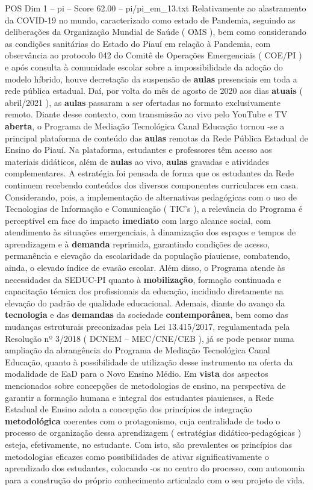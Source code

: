 \begin{textsample}{POS Dim 1 – pi – Score 62.00 – pi/pi\_em\_13.txt}
Relativamente ao alastramento da COVID-19 no mundo, caracterizado como estado de Pandemia, seguindo as deliberações da Organização Mundial de Saúde ( OMS ), bem como considerando as condições sanitárias do Estado do Piauí em relação à Pandemia, com observância ao protocolo 042 do Comitê de Operações Emergenciais ( COE/PI ) e após consulta à comunidade escolar sobre a impossibilidade da adoção do modelo híbrido, houve decretação da suspensão de \textbf{aulas} presenciais em toda a rede pública estadual.
Daí, por volta do mês de agosto de 2020 aos dias \textbf{atuais} ( abril/2021 ), as \textbf{aulas} passaram a ser ofertadas no formato exclusivamente remoto.
Diante desse contexto, com transmissão ao vivo pelo YouTube e TV \textbf{aberta}, o Programa de Mediação Tecnológica Canal Educação tornou -se a principal plataforma de conteúdo das \textbf{aulas} remotas da Rede Pública Estadual de Ensino do Piauí.
Na plataforma, estudantes e professores têm acesso aos materiais didáticos, além de \textbf{aulas} ao vivo, \textbf{aulas} gravadas e atividades complementares.
A estratégia foi pensada de forma que os estudantes da Rede continuem recebendo conteúdos dos diversos componentes curriculares em casa.
Considerando, pois, a implementação de alternativas pedagógicas com o uso de Tecnologias de Informação e Comunicação ( TIC’s ), a relevância do Programa é perceptível em face do impacto \textbf{imediato} com largo alcance social, com atendimento às situações emergenciais, à dinamização dos espaços e tempos de aprendizagem e à \textbf{demanda} reprimida, garantindo condições de acesso, permanência e elevação da escolaridade da população piauiense, combatendo, ainda, o elevado índice de evasão escolar.
Além disso, o Programa atende às necessidades da SEDUC-PI quanto à \textbf{mobilização}, formação continuada e capacitação técnica dos profissionais da educação, incidindo diretamente na elevação do padrão de qualidade educacional.
Ademais, diante do avanço da \textbf{tecnologia} e das \textbf{demandas} da sociedade \textbf{contemporânea}, bem como das mudanças estruturais preconizadas pela Lei 13.415/2017, regulamentada pela Resolução nº 3/2018 ( DCNEM – MEC/CNE/CEB ), já se pode pensar numa ampliação da abrangência do Programa de Mediação Tecnológica Canal Educação, quanto à possibilidade de utilização desse instrumento na oferta da modalidade de EaD para o Novo Ensino Médio.
Em \textbf{vista} dos aspectos mencionados sobre concepções de metodologias de ensino, na perspectiva de garantir a formação humana e integral dos estudantes piauienses, a Rede Estadual de Ensino adota a concepção dos princípios de integração \textbf{metodológica} coerentes com o protagonismo, cuja centralidade de todo o processo de organização dessa aprendizagem ( estratégias didático-pedagógicas ) esteja, efetivamente, no estudante.
Com isto, são prevalentes os princípios das metodologias eficazes como possibilidades de ativar significativamente o aprendizado dos estudantes, colocando -os no centro do processo, com autonomia para a construção do próprio conhecimento articulado com o seu projeto de vida.


\end{textsample}
